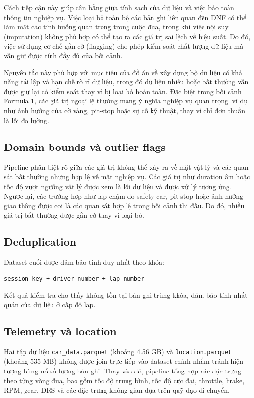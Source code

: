 \documentclass[conference]{IEEEtran}
\begin{document}
Cách tiếp cận này giúp cân bằng giữa tính sạch của dữ liệu và việc bảo toàn thông tin nghiệp vụ. Việc loại bỏ toàn bộ các bản ghi liên quan đến DNF có thể làm mất các tình huống quan trọng trong cuộc đua, trong khi việc nội suy (imputation) không phù hợp có thể tạo ra các giá trị sai lệch về hiệu suất. Do đó, việc sử dụng cơ chế gắn cờ (flagging) cho phép kiểm soát chất lượng dữ liệu mà vẫn giữ được tính đầy đủ của bối cảnh.

Nguyên tắc này phù hợp với mục tiêu của đồ án về xây dựng bộ dữ liệu có khả năng tái lập và hạn chế rò rỉ dữ liệu, trong đó dữ liệu nhiễu hoặc bất thường vẫn được giữ lại có kiểm soát thay vì bị loại bỏ hoàn toàn. Đặc biệt trong bối cảnh Formula 1, các giá trị ngoại lệ thường mang ý nghĩa nghiệp vụ quan trọng, ví dụ như ảnh hưởng của cờ vàng, pit-stop hoặc sự cố kỹ thuật, thay vì chỉ đơn thuần là lỗi đo lường.

\subsection{Domain bounds và outlier flags}

Pipeline phân biệt rõ giữa các giá trị không thể xảy ra về mặt vật lý và các quan sát bất thường nhưng hợp lệ về mặt nghiệp vụ. Các giá trị như duration âm hoặc tốc độ vượt ngưỡng vật lý được xem là lỗi dữ liệu và được xử lý tương ứng. Ngược lại, các trường hợp như lap chậm do safety car, pit-stop hoặc ảnh hưởng giao thông được coi là các quan sát hợp lệ trong bối cảnh thi đấu. Do đó, nhiều giá trị bất thường được gắn cờ thay vì loại bỏ.

\subsection{Deduplication}

Dataset cuối được đảm bảo tính duy nhất theo khóa:

\begin{lstlisting}
session_key + driver_number + lap_number
\end{lstlisting}

Kết quả kiểm tra cho thấy không tồn tại bản ghi trùng khóa, đảm bảo tính nhất quán của dữ liệu ở cấp độ lap.

\subsection{Telemetry và location}

Hai tập dữ liệu \texttt{car\_data.parquet} (khoảng 4.56 GB) và \texttt{location.parquet} (khoảng 535 MB) không được join trực tiếp vào dataset chính nhằm tránh hiện tượng bùng nổ số lượng bản ghi. Thay vào đó, pipeline tổng hợp các đặc trưng theo từng vòng đua, bao gồm tốc độ trung bình, tốc độ cực đại, throttle, brake, RPM, gear, DRS và các đặc trưng không gian dựa trên quỹ đạo di chuyển.
\end{document}
